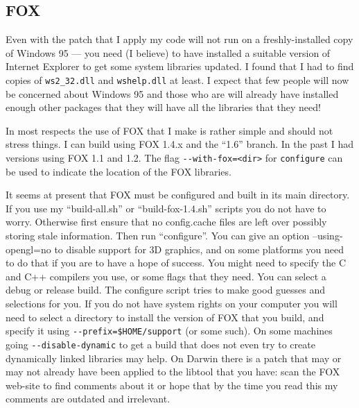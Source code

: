 \documentclass[11pt]{article}
\begin{document}
\subsection{FOX}
Even with the patch that I apply my code will not run on
a freshly-installed copy of Windows 95 --- you need (I believe) to have
installed a suitable version of Internet Explorer to get some system
libraries updated. I found that I had to find copies of \verb+ws2_32.dll+
and \verb+wshelp.dll+ at least. I expect that few people will now be
concerned about Windows 95 and those who are will already have installed
enough other packages that they will have all the libraries that they need!


In most respects the use of FOX that I make is rather simple and should
not stress things. I can build using FOX 1.4.x and the ``1.6'' branch.
In the past I had versions using FOX 1.1 and 1.2.
The flag \verb+--with-fox=<dir>+
for \verb+configure+ can be used to indicate the location
of the FOX libraries. 

It seems at present that FOX must be configured and built in its main
directory. If you use my ``build-all.sh'' or ``build-fox-1.4.sh'' scripts
you do not have to worry. Otherwise first ensure that no config.cache files
are left over possibly storing stale information. Then run ``configure''.
You can give an option --using-opengl=no to disable support for 3D graphics,
and on some platforms you need to do that if you are to have a hope of
success. You might need to specify the C and C++ compilers you use, or some
flags that they need. You can select a debug or release build. The
configure script tries to make good guesses and selections for you.
If you do not have system rights on your computer you will need to
select a directory to install the version of FOX that you build, and
specify it using \verb+--prefix=$HOME/support+ (or some such). On some
machines going \verb+--disable-dynamic+ to get a build that does not even try
to create dynamically linked libraries may help. On Darwin there is a patch
that may or may not already have been applied to the libtool that you have:
scan the FOX web-site to find comments about it or hope that by the time
you read this my comments are outdated and irrelevant.
\end{document}

